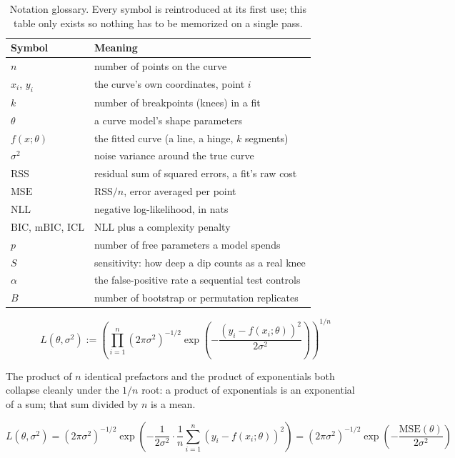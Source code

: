 \documentclass[11pt]{article}
\begin{document}
\begin{table}[H]
\centering
\small
\begin{tabular}{@{}ll@{}}
\toprule
Symbol & Meaning \\
\midrule
$n$ & number of points on the curve \\
$x_i$, $y_i$ & the curve's own coordinates, point $i$ \\
$k$ & number of breakpoints (knees) in a fit \\
$\theta$ & a curve model's shape parameters \\
$f(x;\theta)$ & the fitted curve (a line, a hinge, $k$ segments) \\
$\sigma^2$ & noise variance around the true curve \\
$\mathrm{RSS}$ & residual sum of squared errors, a fit's raw cost \\
$\mathrm{MSE}$ & $\mathrm{RSS}/n$, error averaged per point \\
$\mathrm{NLL}$ & negative log-likelihood, in nats \\
$\mathrm{BIC}$, $\mathrm{mBIC}$, $\mathrm{ICL}$ & $\mathrm{NLL}$ plus a complexity penalty \\
$p$ & number of free parameters a model spends \\
$S$ & sensitivity: how deep a dip counts as a real knee \\
$\alpha$ & the false-positive rate a sequential test controls \\
$B$ & number of bootstrap or permutation replicates \\
\bottomrule
\end{tabular}
\caption{Notation glossary. Every symbol is reintroduced at its first
use; this table only exists so nothing has to be memorized on a single
pass.}
\label{tab:elbow-notation}
\end{table}

\begin{equation}
L(\theta,\sigma^2) := \left(\prod_{i=1}^n (2\pi\sigma^2)^{-1/2}
\exp\!\left(-\frac{(y_i - f(x_i;\theta))^2}{2\sigma^2}\right)\right)^{1/n}
\end{equation}

The product of $n$ identical prefactors and the product of exponentials
both collapse cleanly under the $1/n$ root: a product of exponentials is
an exponential of a sum; that sum divided by $n$ is a mean.

\begin{equation}
L(\theta,\sigma^2) = (2\pi\sigma^2)^{-1/2}
\exp\!\left(-\frac{1}{2\sigma^2}\cdot\frac{1}{n}\sum_{i=1}^n (y_i - f(x_i;\theta))^2\right)
= (2\pi\sigma^2)^{-1/2}\exp\!\left(-\frac{\mathrm{MSE}(\theta)}{2\sigma^2}\right)
\end{equation}
\end{document}
